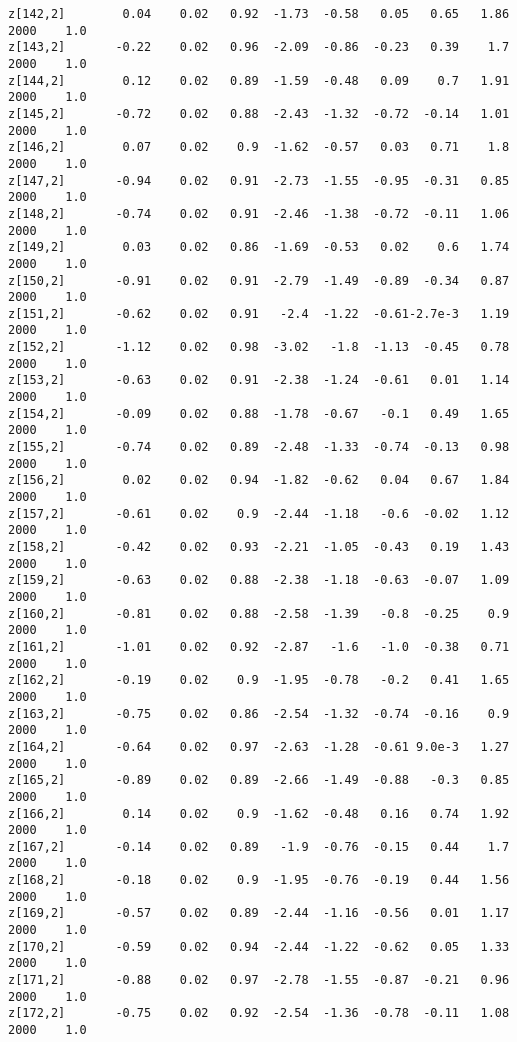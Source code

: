 \documentclass[11pt]{article}
\begin{document}
\begin{Verbatim}[commandchars=\\\{\}]
z[142,2]        0.04    0.02   0.92  -1.73  -0.58   0.05   0.65   1.86   2000    1.0
z[143,2]       -0.22    0.02   0.96  -2.09  -0.86  -0.23   0.39    1.7   2000    1.0
z[144,2]        0.12    0.02   0.89  -1.59  -0.48   0.09    0.7   1.91   2000    1.0
z[145,2]       -0.72    0.02   0.88  -2.43  -1.32  -0.72  -0.14   1.01   2000    1.0
z[146,2]        0.07    0.02    0.9  -1.62  -0.57   0.03   0.71    1.8   2000    1.0
z[147,2]       -0.94    0.02   0.91  -2.73  -1.55  -0.95  -0.31   0.85   2000    1.0
z[148,2]       -0.74    0.02   0.91  -2.46  -1.38  -0.72  -0.11   1.06   2000    1.0
z[149,2]        0.03    0.02   0.86  -1.69  -0.53   0.02    0.6   1.74   2000    1.0
z[150,2]       -0.91    0.02   0.91  -2.79  -1.49  -0.89  -0.34   0.87   2000    1.0
z[151,2]       -0.62    0.02   0.91   -2.4  -1.22  -0.61-2.7e-3   1.19   2000    1.0
z[152,2]       -1.12    0.02   0.98  -3.02   -1.8  -1.13  -0.45   0.78   2000    1.0
z[153,2]       -0.63    0.02   0.91  -2.38  -1.24  -0.61   0.01   1.14   2000    1.0
z[154,2]       -0.09    0.02   0.88  -1.78  -0.67   -0.1   0.49   1.65   2000    1.0
z[155,2]       -0.74    0.02   0.89  -2.48  -1.33  -0.74  -0.13   0.98   2000    1.0
z[156,2]        0.02    0.02   0.94  -1.82  -0.62   0.04   0.67   1.84   2000    1.0
z[157,2]       -0.61    0.02    0.9  -2.44  -1.18   -0.6  -0.02   1.12   2000    1.0
z[158,2]       -0.42    0.02   0.93  -2.21  -1.05  -0.43   0.19   1.43   2000    1.0
z[159,2]       -0.63    0.02   0.88  -2.38  -1.18  -0.63  -0.07   1.09   2000    1.0
z[160,2]       -0.81    0.02   0.88  -2.58  -1.39   -0.8  -0.25    0.9   2000    1.0
z[161,2]       -1.01    0.02   0.92  -2.87   -1.6   -1.0  -0.38   0.71   2000    1.0
z[162,2]       -0.19    0.02    0.9  -1.95  -0.78   -0.2   0.41   1.65   2000    1.0
z[163,2]       -0.75    0.02   0.86  -2.54  -1.32  -0.74  -0.16    0.9   2000    1.0
z[164,2]       -0.64    0.02   0.97  -2.63  -1.28  -0.61 9.0e-3   1.27   2000    1.0
z[165,2]       -0.89    0.02   0.89  -2.66  -1.49  -0.88   -0.3   0.85   2000    1.0
z[166,2]        0.14    0.02    0.9  -1.62  -0.48   0.16   0.74   1.92   2000    1.0
z[167,2]       -0.14    0.02   0.89   -1.9  -0.76  -0.15   0.44    1.7   2000    1.0
z[168,2]       -0.18    0.02    0.9  -1.95  -0.76  -0.19   0.44   1.56   2000    1.0
z[169,2]       -0.57    0.02   0.89  -2.44  -1.16  -0.56   0.01   1.17   2000    1.0
z[170,2]       -0.59    0.02   0.94  -2.44  -1.22  -0.62   0.05   1.33   2000    1.0
z[171,2]       -0.88    0.02   0.97  -2.78  -1.55  -0.87  -0.21   0.96   2000    1.0
z[172,2]       -0.75    0.02   0.92  -2.54  -1.36  -0.78  -0.11   1.08   2000    1.0

\end{Verbatim}
\end{document}
